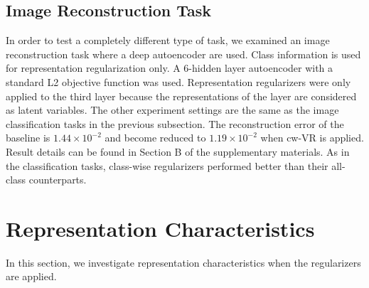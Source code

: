 \subsection{Image Reconstruction Task}
In order to test a completely different type of task, we examined an image reconstruction task where a deep autoencoder are used. Class information is used for representation regularization only. A 6-hidden layer autoencoder with a standard L2 objective function was used. Representation regularizers were only applied to the third layer because the representations of the layer are considered as latent variables. The other experiment settings are the same as the image classification tasks in the previous subsection. The reconstruction error of the baseline is $1.44 \times 10^{-2}$ and become reduced to $1.19 \times 10^{-2}$ when cw-VR is applied. Result details can be found in Section B of the supplementary materials.
As in the classification tasks, class-wise regularizers performed better than their all-class counterparts.








\section{Representation Characteristics}


In this section, we investigate representation characteristics when the regularizers are applied. 

